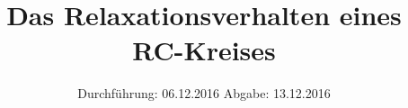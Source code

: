 

\subject{V 353}
\title{Das Relaxationsverhalten eines RC-Kreises}
\date{
\centering
  Durchführung: 06.12.2016
  \hspace{3em}
  Abgabe: 13.12.2016
}



\maketitle
\thispagestyle{empty}
\tableofcontents
\newpage








\printbibliography


